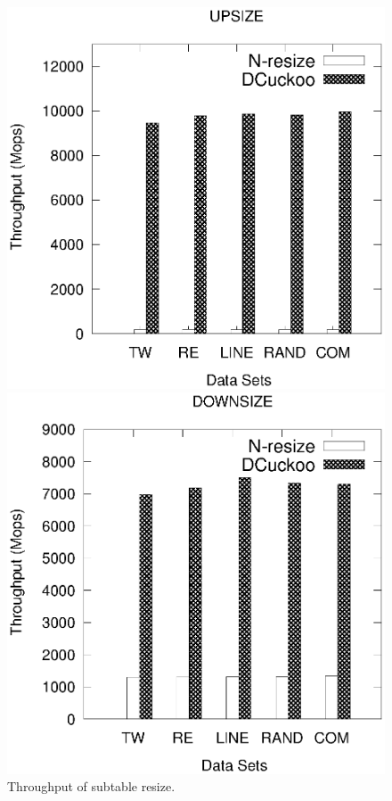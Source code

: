 %
\begin{figure}[t]
	\begin{minipage}{0.48\linewidth}\centering
		\includegraphics[width=\linewidth]{pic/compare/upsize.eps}
		\centerline{}
	\end{minipage}
	\hfill
	\begin{minipage}{0.48\linewidth}\centering
		\includegraphics[width=\linewidth]{pic/compare/downsize.eps}
		\centerline{}
	\end{minipage}
	\caption{Throughput of subtable resize.}
	\label{fig:resize}
\end{figure}

